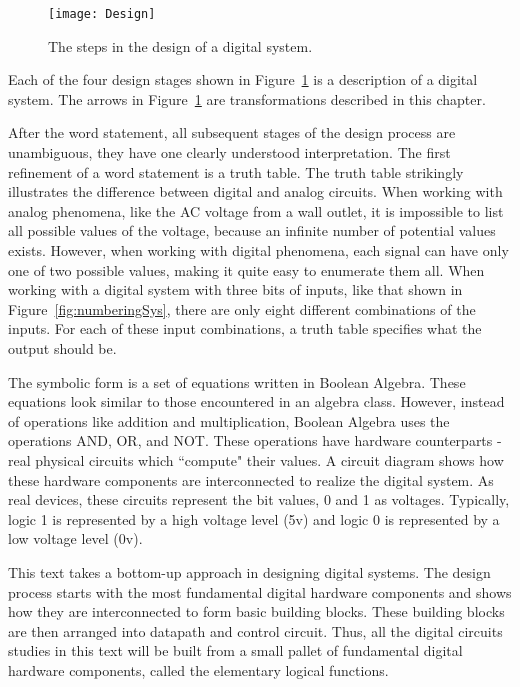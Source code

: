 \begin{figure}[ht]
    \texttt{[image: Design]}
    \caption{The steps in the design of a digital system.}
    \label{fig:representationsDesign}
\end{figure}

Each of the four design stages shown in Figure~\ref{fig:representationsDesign}
is a description of a digital system.  The arrows in
Figure~\ref{fig:representationsDesign} are
transformations described in this chapter.

After the word statement, all subsequent stages of the design process
are unambiguous, they have one clearly understood interpretation.  The first
refinement of a word statement is a truth table.  The truth table strikingly
illustrates the difference between digital and analog circuits.  When
working with analog phenomena, like the AC voltage from a wall outlet,
it is impossible to list all possible values of the voltage, because
an infinite number of potential values exists.  However, when working
with digital phenomena, each signal can have only one of two possible values,
making it quite easy to enumerate them all.  When working with a
digital system with three bits of inputs, like that shown in
Figure~\ref{fig:numberingSys}, there are only eight
different combinations of the inputs.  For each of these input
combinations, a truth table specifies what the output should be.

The symbolic form is a set of equations written in Boolean Algebra.
These equations look similar to those encountered
in an algebra class. However, instead of operations like addition
and multiplication, Boolean Algebra uses the operations AND, OR, and
NOT.  These operations have hardware counterparts - real physical
circuits which ``compute" their values.  A circuit diagram shows how
these hardware components are interconnected to realize the
digital system.  As real devices, these circuits represent the bit
values, 0 and 1 as voltages.  Typically, logic 1 is represented by
a high voltage level (5v) and logic 0 is represented by a low
voltage level (0v).

This text takes a bottom-up approach in designing digital systems.
The design process starts with the most fundamental digital hardware
components and shows how they are interconnected to form basic building
blocks.  These building blocks are then arranged into datapath and
control circuit.  Thus, all the digital circuits studies in this text
will be built from a small pallet of fundamental digital hardware
components, called the elementary logical functions.


